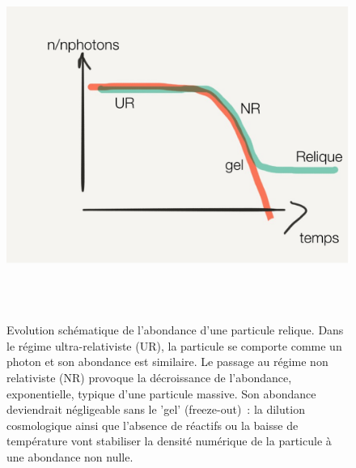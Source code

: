 \begin{figure}[htbp]
	\centering
		\includegraphics[height=12cm]{figs/freeze.png}
	\caption{Evolution schématique de l'abondance d'une particule relique. Dans le régime ultra-relativiste (UR), la particule se comporte comme un photon et son abondance est similaire. Le passage au régime non relativiste (NR) provoque la décroissance de l'abondance, exponentielle, typique d'une particule massive. Son abondance deviendrait négligeable sans le 'gel' (freeze-out)~: la dilution cosmologique ainsi que l'absence de réactifs ou la baisse de température vont stabiliser la densité numérique de la particule à une abondance non nulle. }
	\label{f:freeze}
\end{figure}
 
